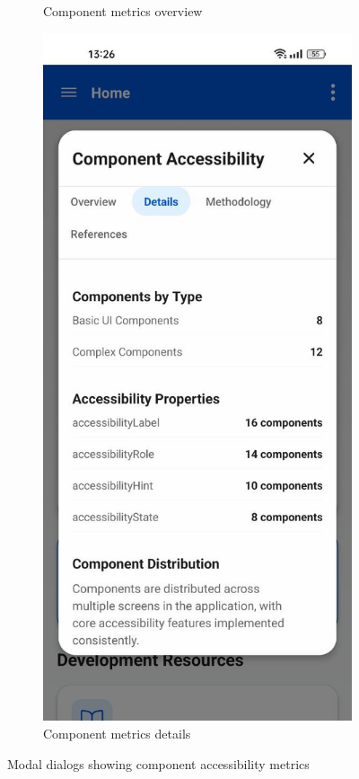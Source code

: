 \begin{figure}[ht]
\begin{subfigure}[b]{0.48\textwidth}
        \caption{Component metrics overview}
        \label{fig:component-overview-modal}
    \end{subfigure}
    \hfill
    \begin{subfigure}[b]{0.48\textwidth}
        \centering
        \includegraphics[width=\linewidth]{img/component-details.jpg}
        \caption{Component metrics details}
        \label{fig:component-details-modal}
    \end{subfigure}
    \caption{Modal dialogs showing component accessibility metrics}
    \label{fig:component_modal_pair}
\end{figure}

